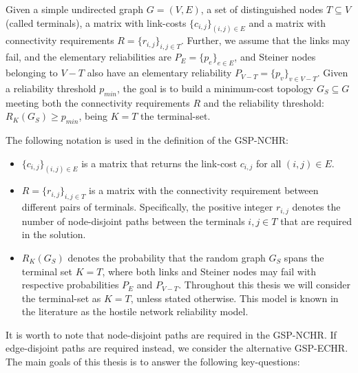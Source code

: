 \begin{definition}
Given a simple undirected graph $G=(V,E)$, a set of distinguished nodes 
$T \subseteq V$ (called terminals), a matrix with link-costs $\{c_{i,j}\}_{(i,j) \in E}$ 
and a matrix with connectivity requirements $R=\{r_{i,j}\}_{i,j \in T}$. 
Further, we assume that the links may fail, and 
the elementary reliabilities are $P_E=\{p_e\}_{e\in E}$, 
and Steiner nodes belonging to $V-T$ also have an elementary reliability 
$P_{V-T}=\{p_v\}_{v\in V-T}$. 
Given a reliability threshold $p_{min}$, the goal is to build 
a minimum-cost topology $G_S \subseteq G$ meeting both the connectivity requirements 
$R$ and the reliability threshold: $R_{K}(G_S) \geq p_{min}$, being $K=T$ the terminal-set.
\end{definition}

The following notation is used in the definition of the GSP-NCHR:
\begin{itemize}
\item  $\{c_{i,j}\}_{(i,j)\in E}$ is a matrix that returns the link-cost $c_{i,j}$ for all $(i,j)\in E$.
\item  $R=\{r_{i,j}\}_{i,j \in T}$ is a matrix with the connectivity requirement 
between different pairs of terminals. Specifically, the positive integer $r_{i,j}$ denotes the number of  
node-disjoint paths between the terminals $i,j\in T$ that are required in the solution. 
\item $R_{K}(G_S)$ denotes the probability that the random graph $G_S$ spans the 
terminal set $K=T$, where both links and Steiner nodes may fail with respective probabilities $P_E$ and $P_{V-T}$. Throughout this thesis we will consider the terminal-set as $K=T$, unless stated otherwise. 
This model is known in the literature as the hostile network reliability model.
\end{itemize}
It is worth to note that node-disjoint paths are required in the GSP-NCHR. If edge-disjoint paths are required  instead, we consider the alternative GSP-ECHR. The main goals of this thesis is to answer the following key-questions:
